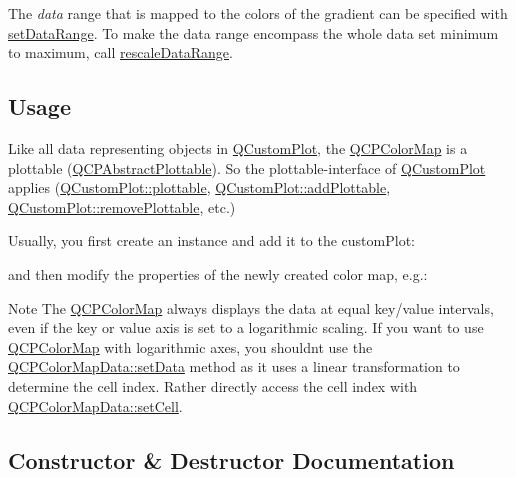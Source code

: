 The {\itshape data} range that is mapped to the colors of the gradient can be specified with \hyperlink{class_q_c_p_color_map_a980b42837821159786a85b4b7dcb8774}{set\+Data\+Range}. To make the data range encompass the whole data set minimum to maximum, call \hyperlink{class_q_c_p_color_map_a856608fa3dd1cc290bcd5f29a5575774}{rescale\+Data\+Range}.\hypertarget{class_q_c_p_statistical_box_usage}{}\subsection{Usage}\label{class_q_c_p_statistical_box_usage}
Like all data representing objects in \hyperlink{class_q_custom_plot}{Q\+Custom\+Plot}, the \hyperlink{class_q_c_p_color_map}{Q\+C\+P\+Color\+Map} is a plottable (\hyperlink{class_q_c_p_abstract_plottable}{Q\+C\+P\+Abstract\+Plottable}). So the plottable-\/interface of \hyperlink{class_q_custom_plot}{Q\+Custom\+Plot} applies (\hyperlink{class_q_custom_plot_a32de81ff53e263e785b83b52ecd99d6f}{Q\+Custom\+Plot\+::plottable}, \hyperlink{class_q_custom_plot_ab7ad9174f701f9c6f64e378df77927a6}{Q\+Custom\+Plot\+::add\+Plottable}, \hyperlink{class_q_custom_plot_af3dafd56884208474f311d6226513ab2}{Q\+Custom\+Plot\+::remove\+Plottable}, etc.)

Usually, you first create an instance and add it to the custom\+Plot\+: 
\begin{DoxyCodeInclude}
\end{DoxyCodeInclude}
and then modify the properties of the newly created color map, e.\+g.\+: 
\begin{DoxyCodeInclude}
\end{DoxyCodeInclude}
 \begin{DoxyNote}{Note}
The \hyperlink{class_q_c_p_color_map}{Q\+C\+P\+Color\+Map} always displays the data at equal key/value intervals, even if the key or value axis is set to a logarithmic scaling. If you want to use \hyperlink{class_q_c_p_color_map}{Q\+C\+P\+Color\+Map} with logarithmic axes, you shouldn\textquotesingle{}t use the \hyperlink{class_q_c_p_color_map_data_afd2083ccfd6987ec94aa7ef8e91ca39a}{Q\+C\+P\+Color\+Map\+Data\+::set\+Data} method as it uses a linear transformation to determine the cell index. Rather directly access the cell index with \hyperlink{class_q_c_p_color_map_data_a8e75eaf8746596319032a93f3d2d0683}{Q\+C\+P\+Color\+Map\+Data\+::set\+Cell}. 
\end{DoxyNote}


\subsection{Constructor \& Destructor Documentation}
